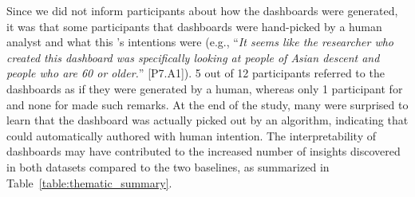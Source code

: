 \par Since we did not inform participants about how the dashboards were generated, it was  that some participants  that  dashboards were hand-picked by a human analyst and  what this 's intentions were (e.g., ``\textit{It seems like the researcher who created this dashboard was specifically looking at people of Asian descent and people who are 60 or older.}'' [P7.A1]).  5 out of 12 participants referred to the \system dashboards as if they were generated by a human, whereas only 1 participant for \cluster and none for \BFS made such remarks. At the end of the study, many were surprised to learn that the \system dashboard was actually picked out by an algorithm, indicating that \system could automatically  authored with human intention. The interpretability of \system dashboards may have contributed to the increased number of insights discovered in both datasets compared to the two baselines, as summarized in Table~\ref{table:thematic_summary}.
